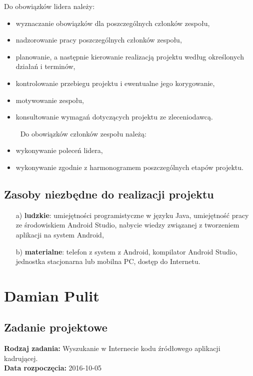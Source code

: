 Do obowiązków lidera należy:
\begin{itemize} \itemsep1pt \parskip0pt 
\item wyznaczanie obowiązków dla poszczególnych członków zespołu,
\item nadzorowanie pracy poszczególnych członków zespołu,
\item planowanie, a następnie kierowanie realizacją projektu według określonych działań i terminów, 
\item kontrolowanie przebiegu projektu i ewentualne jego korygowanie,
\item motywowanie zespołu,
\item konsultowanie wymagań dotyczących projektu ze zleceniodawcą.
\end{itemize}
$\qquad$ Do obowiązków członków zespołu należą:
\begin{itemize}\itemsep1pt \parskip0pt 
\item wykonywanie poleceń lidera,
\item wykonywanie zgodnie z harmonogramem poszczególnych etapów projektu.
\end{itemize}
\section{Zasoby niezbędne do realizacji projektu}
\begin{itemize}
\item [a)] \textbf{ludzkie}: umiejętności programistyczne w języku Java, umiejętność pracy ze środowiskiem Android Studio, nabycie wiedzy związanej z tworzeniem aplikacji na system Android,
\item [b)] \textbf{materialne}: telefon z system z Android, kompilator Android Studio, jednostka stacjonarna lub mobilna PC, dostęp do Internetu.
\end{itemize}


\chapter {Damian Pulit}
\section{Zadanie projektowe}
\noindent\textbf{Rodzaj zadania:}  Wyszukanie w Internecie kodu źródłowego aplikacji kadrującej.\\

\noindent\textbf{Data rozpoczęcia:} 2016-10-05\\

